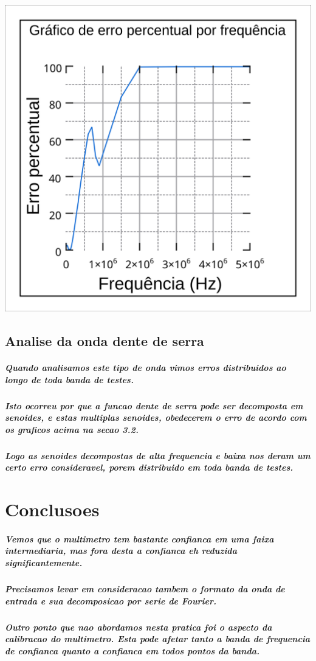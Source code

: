 \documentclass[12pt,twoside, a4paper, twocolumn]{article}
\begin{document}
\begin{adjustbox}{scale=0.30}
    \includegraphics{Grafico2.png}
\end{adjustbox}

\subsection{Analise da onda dente de serra}

\subparagraph*{Quando analisamos este tipo de onda vimos erros distribuidos ao longo de toda banda de testes.}

\subparagraph*{Isto ocorreu por que a funcao dente de serra pode ser decomposta em senoides, e estas multiplas senoides, obedecerem o erro de acordo com os graficos acima na secao \emph{3.2}.}


\subparagraph*{Logo as senoides decompostas de alta frequencia e baixa nos deram um certo erro consideravel, porem distribuido em toda banda  de testes.}

\newpage
\section{Conclusoes}

\subparagraph*{Vemos que o multimetro tem bastante confianca em uma faixa intermediaria, mas fora desta a confianca eh reduzida significantemente.}

\subparagraph*{Precisamos levar em consideracao tambem o formato da onda de entrada e sua decomposicao por serie de Fourier.}

\subparagraph*{Outro ponto que nao abordamos nesta pratica foi o aspecto da calibracao do multimetro. Esta pode afetar tanto a banda de frequencia de confianca quanto a confianca em todos pontos da banda.}
\end{document}
